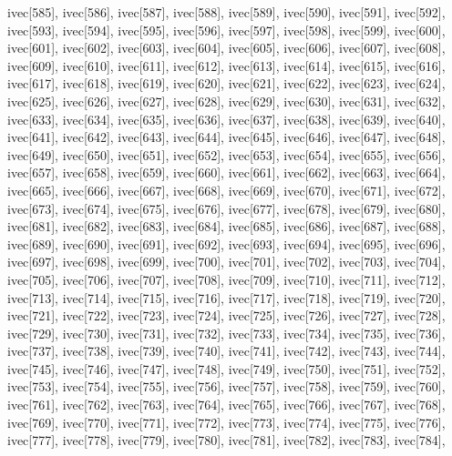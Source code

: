 \begin{DoxyCode}
{  ivec[585],
  ivec[586],
  ivec[587],
  ivec[588],
  ivec[589],
  ivec[590],
  ivec[591],
  ivec[592],
  ivec[593],
  ivec[594],
  ivec[595],
  ivec[596],
  ivec[597],
  ivec[598],
  ivec[599],
  ivec[600],
  ivec[601],
  ivec[602],
  ivec[603],
  ivec[604],
  ivec[605],
  ivec[606],
  ivec[607],
  ivec[608],
  ivec[609],
  ivec[610],
  ivec[611],
  ivec[612],
  ivec[613],
  ivec[614],
  ivec[615],
  ivec[616],
  ivec[617],
  ivec[618],
  ivec[619],
  ivec[620],
  ivec[621],
  ivec[622],
  ivec[623],
  ivec[624],
  ivec[625],
  ivec[626],
  ivec[627],
  ivec[628],
  ivec[629],
  ivec[630],
  ivec[631],
  ivec[632],
  ivec[633],
  ivec[634],
  ivec[635],
  ivec[636],
  ivec[637],
  ivec[638],
  ivec[639],
  ivec[640],
  ivec[641],
  ivec[642],
  ivec[643],
  ivec[644],
  ivec[645],
  ivec[646],
  ivec[647],
  ivec[648],
  ivec[649],
  ivec[650],
  ivec[651],
  ivec[652],
  ivec[653],
  ivec[654],
  ivec[655],
  ivec[656],
  ivec[657],
  ivec[658],
  ivec[659],
  ivec[660],
  ivec[661],
  ivec[662],
  ivec[663],
  ivec[664],
  ivec[665],
  ivec[666],
  ivec[667],
  ivec[668],
  ivec[669],
  ivec[670],
  ivec[671],
  ivec[672],
  ivec[673],
  ivec[674],
  ivec[675],
  ivec[676],
  ivec[677],
  ivec[678],
  ivec[679],
  ivec[680],
  ivec[681],
  ivec[682],
  ivec[683],
  ivec[684],
  ivec[685],
  ivec[686],
  ivec[687],
  ivec[688],
  ivec[689],
  ivec[690],
  ivec[691],
  ivec[692],
  ivec[693],
  ivec[694],
  ivec[695],
  ivec[696],
  ivec[697],
  ivec[698],
  ivec[699],
  ivec[700],
  ivec[701],
  ivec[702],
  ivec[703],
  ivec[704],
  ivec[705],
  ivec[706],
  ivec[707],
  ivec[708],
  ivec[709],
  ivec[710],
  ivec[711],
  ivec[712],
  ivec[713],
  ivec[714],
  ivec[715],
  ivec[716],
  ivec[717],
  ivec[718],
  ivec[719],
  ivec[720],
  ivec[721],
  ivec[722],
  ivec[723],
  ivec[724],
  ivec[725],
  ivec[726],
  ivec[727],
  ivec[728],
  ivec[729],
  ivec[730],
  ivec[731],
  ivec[732],
  ivec[733],
  ivec[734],
  ivec[735],
  ivec[736],
  ivec[737],
  ivec[738],
  ivec[739],
  ivec[740],
  ivec[741],
  ivec[742],
  ivec[743],
  ivec[744],
  ivec[745],
  ivec[746],
  ivec[747],
  ivec[748],
  ivec[749],
  ivec[750],
  ivec[751],
  ivec[752],
  ivec[753],
  ivec[754],
  ivec[755],
  ivec[756],
  ivec[757],
  ivec[758],
  ivec[759],
  ivec[760],
  ivec[761],
  ivec[762],
  ivec[763],
  ivec[764],
  ivec[765],
  ivec[766],
  ivec[767],
  ivec[768],
  ivec[769],
  ivec[770],
  ivec[771],
  ivec[772],
  ivec[773],
  ivec[774],
  ivec[775],
  ivec[776],
  ivec[777],
  ivec[778],
  ivec[779],
  ivec[780],
  ivec[781],
  ivec[782],
  ivec[783],
  ivec[784],
}
\end{DoxyCode}
